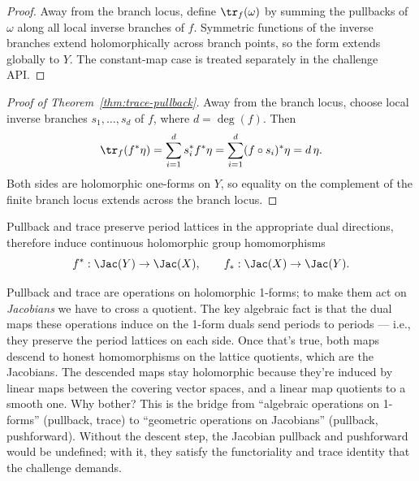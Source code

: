 \begin{proof}\leanok
Away from the branch locus, define \(\tr_f(\omega)\) by summing the pullbacks
of \(\omega\) along all local inverse branches of \(f\). Symmetric functions
of the inverse branches extend holomorphically across branch points, so the
form extends globally to \(Y\). The constant-map case is treated separately in
the challenge API.
\end{proof}

\begin{proof}[Proof of Theorem~\ref{thm:trace-pullback}]\leanok
Away from the branch locus, choose local inverse branches
\(s_1,\dots,s_d\) of \(f\), where \(d=\deg(f)\). Then
\[
  \tr_f(f^{*}\eta)
  =
  \sum_{i=1}^{d}s_i^{*}f^{*}\eta
  =
  \sum_{i=1}^{d}(f\circ s_i)^{*}\eta
  =
  d\,\eta.
\]
Both sides are holomorphic one-forms on \(Y\), so equality on the complement
of the finite branch locus extends across the branch locus.
\end{proof}

\begin{lemma}
\label{lem:push-pull-descend}
Pullback and trace preserve period lattices in the appropriate dual directions,
therefore induce continuous holomorphic group homomorphisms
\[
  f^{*}:\Jac(Y)\to\Jac(X), \qquad f_*:\Jac(X)\to\Jac(Y).
\]
\leanok
\end{lemma}

\begin{layman}
Pullback and trace are operations on holomorphic 1-forms; to make them
act on \emph{Jacobians} we have to cross a quotient. The key algebraic
fact is that the dual maps these operations induce on the 1-form duals
send periods to periods — i.e., they preserve the period lattices on
each side. Once that's true, both maps descend to honest homomorphisms
on the lattice quotients, which are the Jacobians. The descended maps
stay holomorphic because they're induced by linear maps between the
covering vector spaces, and a linear map quotients to a smooth one.
Why bother? This is the bridge from ``algebraic operations on 1-forms''
(pullback, trace) to ``geometric operations on Jacobians'' (pullback,
pushforward). Without the descent step, the Jacobian pullback and
pushforward would be undefined; with it, they satisfy the functoriality
and trace identity that the challenge demands.
\end{layman}

